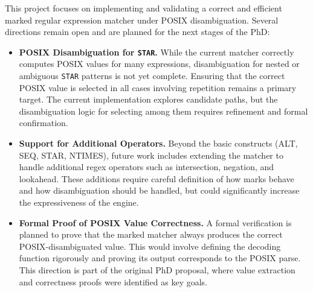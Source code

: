 \documentclass[12pt]{article}
\begin{document}
This project focuses on implementing and validating a correct and efficient marked regular expression matcher under POSIX disambiguation. Several directions remain open and are planned for the next stages of the PhD:

\begin{itemize}
\item \textbf{POSIX Disambiguation for \texttt{STAR}.}
While the current matcher correctly computes POSIX values for many expressions, disambiguation for nested or ambiguous \texttt{STAR} patterns is not yet complete. Ensuring that the correct POSIX value is selected in all cases involving repetition remains a primary target. The current implementation explores candidate paths, but the disambiguation logic for selecting among them requires refinement and formal confirmation.

\item \textbf{Support for Additional Operators.}
Beyond the basic constructs (ALT, SEQ, STAR, NTIMES), future work includes extending the matcher to handle additional regex operators such as intersection, negation, and lookahead. These additions require careful definition of how marks behave and how disambiguation should be handled, but could significantly increase the expressiveness of the engine.

\item \textbf{Formal Proof of POSIX Value Correctness.}
A formal verification is planned to prove that the marked matcher always produces the correct POSIX-disambiguated value. This would involve defining the decoding function rigorously and proving its output corresponds to the POSIX parse. This direction is part of the original PhD proposal, where value extraction and correctness proofs were identified as key goals.


\end{itemize}




\end{document}
